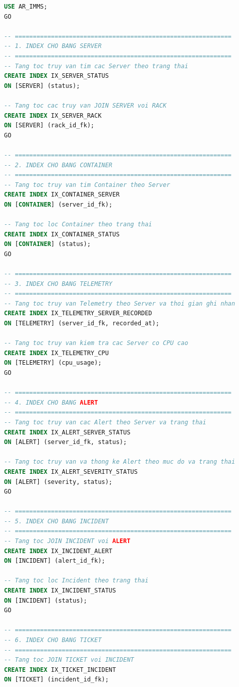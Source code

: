 \begin{lstlisting}[language=SQL]
USE AR_IMMS;
GO

-- ============================================================
-- 1. INDEX CHO BANG SERVER
-- ============================================================
-- Tang toc truy van tim cac Server theo trang thai
CREATE INDEX IX_SERVER_STATUS
ON [SERVER] (status);

-- Tang toc cac truy van JOIN SERVER voi RACK
CREATE INDEX IX_SERVER_RACK
ON [SERVER] (rack_id_fk);
GO

-- ============================================================
-- 2. INDEX CHO BANG CONTAINER
-- ============================================================
-- Tang toc truy van tim Container theo Server
CREATE INDEX IX_CONTAINER_SERVER
ON [CONTAINER] (server_id_fk);

-- Tang toc loc Container theo trang thai
CREATE INDEX IX_CONTAINER_STATUS
ON [CONTAINER] (status);
GO

-- ============================================================
-- 3. INDEX CHO BANG TELEMETRY
-- ============================================================
-- Tang toc truy van Telemetry theo Server va thoi gian ghi nhan
CREATE INDEX IX_TELEMETRY_SERVER_RECORDED
ON [TELEMETRY] (server_id_fk, recorded_at);

-- Tang toc truy van kiem tra cac Server co CPU cao
CREATE INDEX IX_TELEMETRY_CPU
ON [TELEMETRY] (cpu_usage);
GO

-- ============================================================
-- 4. INDEX CHO BANG ALERT
-- ============================================================
-- Tang toc truy van cac Alert theo Server va trang thai
CREATE INDEX IX_ALERT_SERVER_STATUS
ON [ALERT] (server_id_fk, status);

-- Tang toc truy van va thong ke Alert theo muc do va trang thai
CREATE INDEX IX_ALERT_SEVERITY_STATUS
ON [ALERT] (severity, status);
GO

-- ============================================================
-- 5. INDEX CHO BANG INCIDENT
-- ============================================================
-- Tang toc JOIN INCIDENT voi ALERT
CREATE INDEX IX_INCIDENT_ALERT
ON [INCIDENT] (alert_id_fk);

-- Tang toc loc Incident theo trang thai
CREATE INDEX IX_INCIDENT_STATUS
ON [INCIDENT] (status);
GO

-- ============================================================
-- 6. INDEX CHO BANG TICKET
-- ============================================================
-- Tang toc JOIN TICKET voi INCIDENT
CREATE INDEX IX_TICKET_INCIDENT
ON [TICKET] (incident_id_fk);


\end{lstlisting}
